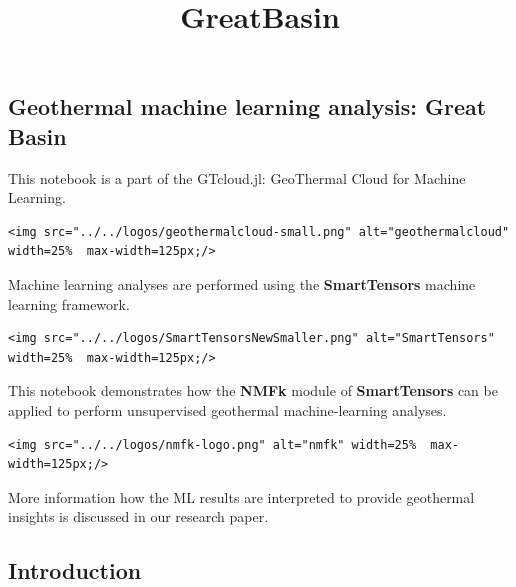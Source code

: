 \documentclass[11pt]{article}
\title{GreatBasin}
\begin{document}
    
    \maketitle
    
    

    
    \hypertarget{geothermal-machine-learning-analysis-great-basin}{%
\subsection{Geothermal machine learning analysis: Great
Basin}\label{geothermal-machine-learning-analysis-great-basin}}

This notebook is a part of the GTcloud.jl: GeoThermal Cloud for Machine
Learning.

\begin{verbatim}
<img src="../../logos/geothermalcloud-small.png" alt="geothermalcloud" width=25%  max-width=125px;/>
\end{verbatim}

Machine learning analyses are performed using the \textbf{SmartTensors}
machine learning framework.

\begin{verbatim}
<img src="../../logos/SmartTensorsNewSmaller.png" alt="SmartTensors" width=25%  max-width=125px;/>
\end{verbatim}

This notebook demonstrates how the \textbf{NMFk} module of
\textbf{SmartTensors} can be applied to perform unsupervised geothermal
machine-learning analyses.

\begin{verbatim}
<img src="../../logos/nmfk-logo.png" alt="nmfk" width=25%  max-width=125px;/>
\end{verbatim}

More information how the ML results are interpreted to provide
geothermal insights is discussed in our research paper.

    \hypertarget{introduction}{%
\subsection{Introduction}\label{introduction}}
\end{document}
